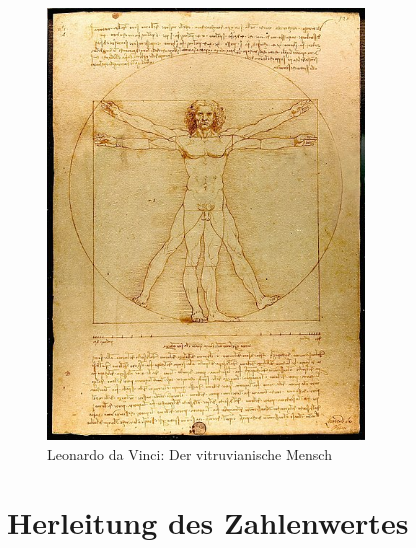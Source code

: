 \documentclass[10pt]{scrartcl}
\begin{document}
\begin{figure}[!htbp]
	\centering
	\includegraphics[width=0.75\textwidth]{441px-Da_Vinci_Vitruve_Luc_Viatour.jpg}
	\caption{Leonardo da Vinci: Der vitruvianische Mensch}
	\label{fig:441px-Da_Vinci_Vitruve_Luc_Viatour}
\end{figure}


\section{Herleitung des Zahlenwertes}
\label{sec:HerleitungDesZahlenwertes}


\newpage
\renewcommand\listtablename{Verzeichnis der verwendeten Tabellen}
\listoftables

\newpage
\renewcommand\listfigurename{Verzeichnis der verwendeten Abbildungen}
\listoffigures
 
\end{document}
